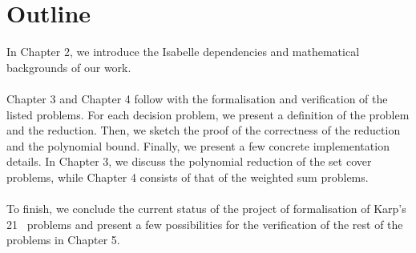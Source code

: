 \section{Outline}
In Chapter 2, we introduce the Isabelle dependencies and mathematical backgrounds of our work.\\\\
Chapter 3 and Chapter 4 follow with the formalisation and verification of the listed problems. For each decision problem, 
we present a definition of the problem and the reduction. Then, we sketch the proof of the correctness of the reduction and the polynomial bound. 
Finally, we present a few concrete implementation details.
In Chapter 3, we discuss the polynomial reduction of the set cover problems, while Chapter 4 consists of that of the weighted sum problems.\\\\
To finish, we conclude the current status of the project of formalisation of Karp's 21 \NPH\ problems 
and present a few possibilities for the verification of the rest of the problems in Chapter 5.
